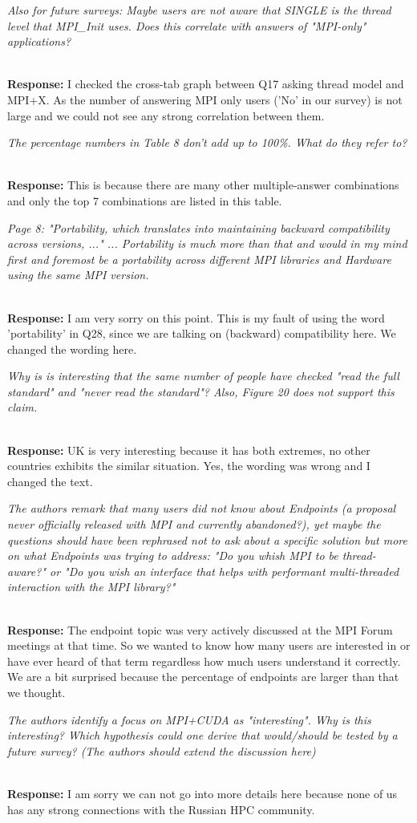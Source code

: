 \documentclass[11pt]{article}
\newcommand{\iresponse}[2]{{\item \em #1}\\%
  {\bf Response:} #2}
\begin{document}
\begin{enumerate}
\iresponse{Also for future surveys: Maybe users are not aware that
  SINGLE is the thread level that MPI\_Init uses. Does this correlate
  with answers of "MPI-only" applications?}
{I checked the cross-tab graph between Q17 asking thread model and
  MPI+X. As the number of answering MPI only users ('No' in our
  survey) is not large and we could not see any strong correlation
  between them. }

\iresponse{The percentage numbers in Table 8 don't add up to
  100\%. What do they refer to?}
{This is because there are many other multiple-answer combinations and
only the top 7 combinations are listed in this table.}

\iresponse{Page 8: "Portability, which translates into maintaining
  backward compatibility across versions, ..." ... Portability is much
  more than that and would in my mind first and foremost be a
  portability across different MPI libraries and Hardware using the
  same MPI version.}
{I am very sorry on this point. This is my fault of using the word
  'portability' in Q28, since we are talking on (backward) compatibility
here. We changed the wording here.}

\iresponse{Why is is interesting that the same number of people have
  checked "read the full standard" and "never read the standard"?
  Also, Figure 20 does not support this claim.}
{UK is very interesting because it has both extremes, no other
  countries exhibits the similar situation. Yes, the wording was wrong
and I changed the text.}

\iresponse{The authors remark that many users did not know about
  Endpoints (a proposal never officially released with MPI and
  currently abandoned?), yet maybe the questions should have been
  rephrased not to ask about a specific solution but more on what
  Endpoints was trying to address: "Do you whish MPI to be
  thread-aware?" or "Do you wish an interface that helps with
  performant multi-threaded interaction with the MPI library?"}
{The endpoint topic was very actively discussed at the MPI Forum
  meetings at that time. So we wanted to know how many users are
  interested in or have ever heard of that term regardless how much
  users understand it correctly. We are a bit
  surprised because the percentage of endpoints are larger than that
  we thought. }

\iresponse{The authors identify a focus on MPI+CUDA as
  "interesting". Why is this interesting? Which hypothesis could one
  derive that would/should be tested by a future survey? (The authors
  should extend the discussion here)}
{I am sorry we can not go into more details here because none of us
  has any strong connections with the Russian HPC community. }

\end{enumerate}
\end{document}
